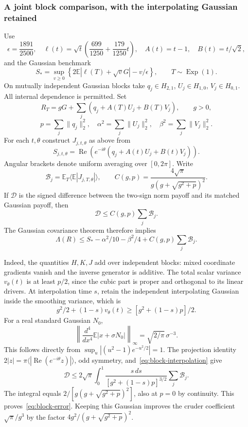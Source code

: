 \subsubsection{A joint block comparison, with the interpolating Gaussian retained}
Use
\[
 \epsilon=\frac{1891}{2500},\quad
 \ell(t)=\sqrt t\left(\frac{699}{1250}+\frac{179}{1250}t\right),
 \quad A(t)=t-1,\quad B(t)=t/\sqrt2,
\]
and the Gaussian benchmark
\[
 S_* =\sup_{v\ge0}\left\{2\mathbb E|\ell(T)+\sqrt vG|-v/\epsilon\right\},
 \qquad T\sim\operatorname{Exp}(1).
\]
On mutually independent Gaussian blocks take
$q_j\in H_{2,1}$, $U_j\in H_{1,0}$, $V_j\in H_{0,1}$.
All internal dependence is permitted. Set
\[
 R_T=gG+\sum_j(q_j+A(T)U_j+B(T)V_j),\qquad g>0,
\]
\[
 p=\sum_j\|q_j\|_2^2,\quad
 \alpha^2=\sum_j\|U_j\|_2^2,\quad
 \beta^2=\sum_j\|V_j\|_2^2.
\]
For each $t,\theta$ construct $J_{j,t,\theta}$ as above from
\[
 S_{j,t,\theta}=\operatorname{Re}\left(e^{-i\theta}
                   (q_j+A(t)U_j+B(t)V_j)\right).
\]
Angular brackets denote uniform averaging over $[0,2\pi]$. Write
\[
 \mathcal B_j=\mathbb E_T\langle\mathbb E|J_{j,T,\theta}|\rangle,
 \qquad
 C(g,p)=\frac{4\sqrt\pi}{g(g+\sqrt{g^2+p})^2}.
\]
If $\mathcal D$ is the signed difference between the two-sign norm
payoff and its matched Gaussian payoff, then
\begin{equation}\label{eq:block-error}
 \boxed{\mathcal D\le C(g,p)\sum_j\mathcal B_j.}
\end{equation}
The Gaussian covariance theorem therefore implies
\begin{equation}\label{eq:block-K}
 \boxed{\Lambda(R)\le S_*-\alpha^2/10-\beta^2/4
                         +C(g,p)\sum_j\mathcal B_j.}
\end{equation}

Indeed, the quantities $H,K,J$ add over independent blocks: mixed
coordinate gradients vanish and the inverse generator is additive.
The total scalar variance $v_\theta(t)$ is at least $p/2$, since the
cubic part is proper and orthogonal to its linear drivers. At
interpolation time $s$, retain the independent interpolating Gaussian
inside the smoothing variance, which is
\[
 g^2/2+(1-s)v_\theta(t)\ge[g^2+(1-s)p]/2.
\]
For a real standard Gaussian $N_0$,
\[
 \left\|\frac{d^4}{dx^4}\mathbb E|x+\sigma N_0|\right\|_\infty
 =\sqrt{2/\pi}\,\sigma^{-3}.
\]
This follows directly from
$\sup_u|(u^2-1)e^{-u^2/2}|=1$. The projection identity
$2|z|=\pi\langle|\operatorname{Re}(e^{-i\theta}z)|\rangle$,
odd symmetry, and~\eqref{eq:block-interpolation} give
\[
 \mathcal D\le
 2\sqrt\pi\int_0^1\frac{s\,ds}{[g^2+(1-s)p]^{3/2}}
 \sum_j\mathcal B_j.
\]
The integral equals $2/[g(g+\sqrt{g^2+p})^2]$, also at $p=0$ by
continuity. This proves~\eqref{eq:block-error}. Keeping this Gaussian
improves the cruder coefficient $\sqrt\pi/g^3$ by the factor
$4g^2/(g+\sqrt{g^2+p})^2$.

